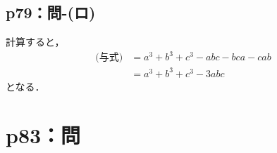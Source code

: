 \subsection*{p79：問-(ロ)}

\begin{tanswer}
  計算すると，
  \begin{align*}
    \text{(与式)} & = a^3 + b^3 + c^3 -abc -bca -cab \\
                & = a^3 + b^3 +c^3 -3abc
  \end{align*}
  となる．
\end{tanswer}



\section*{p83：問}

